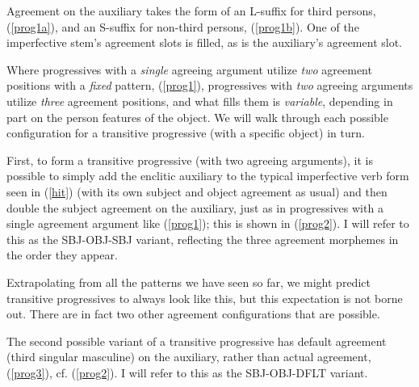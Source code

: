 \documentclass[output=paper
,modfonts
,nonflat]{langsci/langscibook}
\begin{document}
\noindent Agreement on the auxiliary takes the form of an L-suffix for third persons, (\ref{prog1a}), and an S-suffix for non-third persons, (\ref{prog1b}). One of the imperfective stem's agreement slots is filled, as is the auxiliary's agreement slot.

Where progressives with a \textit{single} agreeing argument utilize \textit{two} agreement positions with a \textit{fixed} pattern, (\ref{prog1}), progressives with \textit{two} agreeing arguments utilize \emph{three} agreement positions, and what fills them is \emph{variable}, depending in part on the person features of the object. We will walk through each possible configuration for a transitive progressive (with a specific object) in turn. 

First, to form a transitive progressive (with two agreeing arguments), it is possible to simply add the enclitic auxiliary to the typical imperfective verb form seen in  (\ref{hit}) (with its own subject and object agreement as usual) and then double the subject agreement on the auxiliary, just as in progressives with a single agreement argument like (\ref{prog1}); this is shown in (\ref{prog2}). I will refer to this as the SBJ-OBJ-SBJ variant, reflecting the three agreement morphemes in the order they appear.

\eal \label{prog2}
\zl

\noindent Extrapolating from all the patterns we have seen so far, we might predict transitive progressives to always look like this, but this expectation is not borne out. There are in fact two other agreement configurations that are possible.

The second possible variant of a transitive progressive has default agreement (third singular masculine) on the auxiliary, rather than actual agreement, (\ref{prog3}), cf. (\ref{prog2}). I will refer to this as the SBJ-OBJ-DFLT variant.

\eal \label{prog3}
\zl
\end{document}
